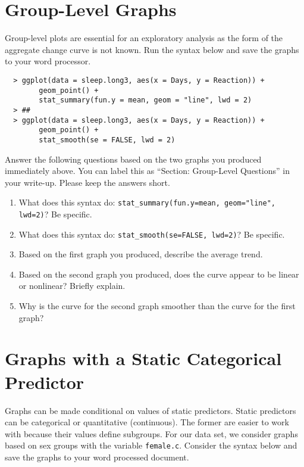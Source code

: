 \documentclass[]{article}
\begin{document}
%
%

\section*{Group-Level Graphs}

\noindent Group-level plots are essential for an exploratory analysis as the form of the aggregate change curve is not known. Run the syntax below and save the graphs to your word processor. 

\begin{verbatim}
  > ggplot(data = sleep.long3, aes(x = Days, y = Reaction)) +
        geom_point() +
        stat_summary(fun.y = mean, geom = "line", lwd = 2)
  > ##
  > ggplot(data = sleep.long3, aes(x = Days, y = Reaction)) + 
        geom_point() +
        stat_smooth(se = FALSE, lwd = 2)
\end{verbatim}

\noindent Answer the following questions based on the two graphs you produced immediately above. You can label this as ``Section: Group-Level Questions'' in your write-up. Please keep the answers short.

\begin{enumerate}[resume]
\item What does this syntax do: \verb|stat_summary(fun.y=mean, geom="line", lwd=2)|? Be specific.
\item What does this syntax do: \verb|stat_smooth(se=FALSE, lwd=2)|? Be specific.
\item Based on the first graph you produced, describe the average trend.
\item Based on the second graph you produced, does the curve appear to be linear or nonlinear? Briefly explain.
\item Why is the curve for the second graph smoother than the curve for the first graph?
\end{enumerate}

%
%
\pagebreak
\section*{Graphs with a Static Categorical Predictor}

\noindent Graphs can be made conditional on values of static predictors. Static predictors can be categorical or quantitative (continuous). The former are easier to work with because their values define subgroups. For our data set, we consider graphs based on sex groups with the variable \texttt{female.c}. Consider the syntax below and save the graphs to your word processed document.
\end{document}
